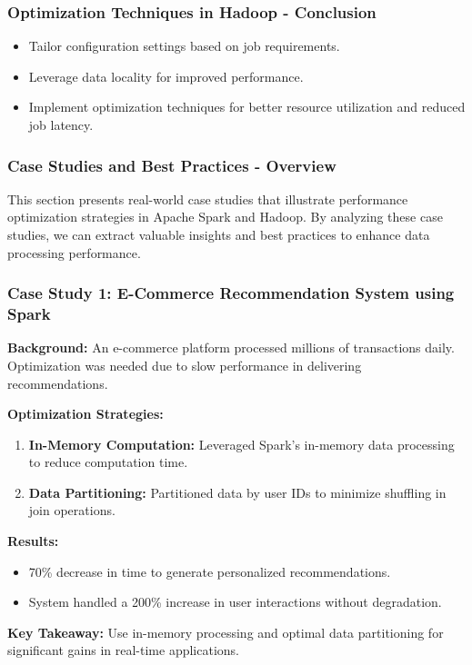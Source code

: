 \documentclass{beamer}
\begin{document}
\begin{frame}[fragile]
    \frametitle{Optimization Techniques in Hadoop - Conclusion}
    \begin{itemize}
        \item Tailor configuration settings based on job requirements.
        \item Leverage data locality for improved performance.
        \item Implement optimization techniques for better resource utilization and reduced job latency.
    \end{itemize}
\end{frame}

\begin{frame}[fragile]
    \frametitle{Case Studies and Best Practices - Overview}
    This section presents real-world case studies that illustrate performance optimization strategies in Apache Spark and Hadoop. 
    By analyzing these case studies, we can extract valuable insights and best practices to enhance data processing performance.
\end{frame}

\begin{frame}[fragile]
    \frametitle{Case Study 1: E-Commerce Recommendation System using Spark}
    
    \textbf{Background:} An e-commerce platform processed millions of transactions daily. 
    Optimization was needed due to slow performance in delivering recommendations.

    \textbf{Optimization Strategies:}
    \begin{enumerate}
        \item \textbf{In-Memory Computation:} Leveraged Spark’s in-memory data processing to reduce computation time.
        \item \textbf{Data Partitioning:} Partitioned data by user IDs to minimize shuffling in join operations.
    \end{enumerate}

    \textbf{Results:}
    \begin{itemize}
        \item 70\% decrease in time to generate personalized recommendations.
        \item System handled a 200\% increase in user interactions without degradation.
    \end{itemize}

    \textbf{Key Takeaway:} Use in-memory processing and optimal data partitioning for significant gains in real-time applications.
\end{frame}
\end{document}
